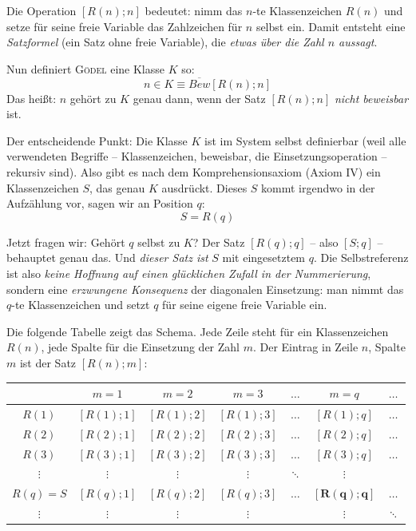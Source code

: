 Die Operation $[R(n); n]$ bedeutet: nimm das $n$-te Klassenzeichen $R(n)$ und
setze für seine freie Variable das Zahlzeichen für $n$ selbst ein. Damit entsteht
eine \textit{Satzformel} (ein Satz ohne freie Variable), die \textit{etwas über die
Zahl $n$ aussagt}.

Nun definiert \textsc{Gödel} eine Klasse $K$ so:
$$
n \in K \equiv \overline{Bew}[R(n); n]
$$
Das heißt: $n$ gehört zu $K$ genau dann, wenn der Satz $[R(n); n]$ \textit{nicht beweisbar} ist.

Der entscheidende Punkt: Die Klasse $K$ ist im System selbst definierbar (weil alle
verwendeten Begriffe -- \frq Klassenzeichen\flq, \frq beweisbar\flq, die Einsetzungsoperation --
rekursiv sind). Also gibt es nach dem Komprehensionsaxiom (Axiom IV) ein Klassenzeichen $S$,
das genau $K$ ausdrückt. Dieses $S$ kommt irgendwo in der Aufzählung vor, sagen wir
an Position $q$:
$$
S = R(q)
$$

Jetzt fragen wir: Gehört $q$ selbst zu $K$? Der Satz $[R(q); q]$ -- also $[S; q]$ --
behauptet genau das. Und \textit{dieser Satz ist} $S$ mit eingesetztem $q$. Die
Selbstreferenz ist also \textit{keine Hoffnung auf einen glücklichen Zufall in der
Nummerierung}, sondern eine \textit{erzwungene Konsequenz} der diagonalen Einsetzung:
man nimmt das $q$-te Klassenzeichen und setzt $q$ für seine eigene freie Variable ein.

Die folgende Tabelle zeigt das Schema. Jede Zeile steht für ein Klassenzeichen $R(n)$,
jede Spalte für die Einsetzung der Zahl $m$. Der Eintrag in Zeile $n$, Spalte $m$
ist der Satz $[R(n); m]$:

\begin{center}
\begin{tabular}{c|cccccc}
	& $m = 1$ & $m = 2$ & $m = 3$ & $\dots$ & $m = q$ & $\dots$ \\
	\hline
	$R(1)$ & $[R(1); 1]$ & $[R(1); 2]$ & $[R(1); 3]$ & $\dots$ & $[R(1); q]$ & $\dots$ \\
	$R(2)$ & $[R(2); 1]$ & $[R(2); 2]$ & $[R(2); 3]$ & $\dots$ & $[R(2); q]$ & $\dots$ \\
	$R(3)$ & $[R(3); 1]$ & $[R(3); 2]$ & $[R(3); 3]$ & $\dots$ & $[R(3); q]$ & $\dots$ \\
	$\vdots$ & $\vdots$ & $\vdots$ & $\vdots$ & $\ddots$ & $\vdots$ & \\
	$R(q) = S$ & $[R(q); 1]$ & $[R(q); 2]$ & $[R(q); 3]$ & $\dots$ & $\mathbf{[R(q); q]}$ & $\dots$ \\
	$\vdots$ & $\vdots$ & $\vdots$ & $\vdots$ & & $\vdots$ & $\ddots$ \\
\end{tabular}
\end{center}

